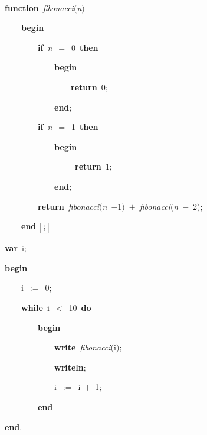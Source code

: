 
\fboxsep=0pt
\def\insert#1{$\fbox{#1}$}
\def\delete#1{$\fboxrule=.5mm\fbox{#1}$}
\rm
\ \par
{\bf function}\ {\it fibonacci}$(${\sl n}$)$\ \par
\ \ \ \ {\bf begin}\ \par
\ \ \ \ \ \ \ \ {\bf if}\ {\sl n}\ $=$\ 0\ {\bf then}\ \par
\ \ \ \ \ \ \ \ \ \ \ \ {\bf begin}\ \par
\ \ \ \ \ \ \ \ \ \ \ \ \ \ \ \ {\bf return}\ 0$;$\ \par
\ \ \ \ \ \ \ \ \ \ \ \ {\bf end}$;$\ \par
\ \ \ \ \ \ \ \ {\bf if}\ {\sl n}\ $=$\ 1\ {\bf then}\ \par
\ \ \ \ \ \ \ \ \ \ \ \ {\bf begin}\ \par
\ \ \ \ \ \ \ \ \ \ \ \ \ \ \ \ \ {\bf return}\ 1$;$\ \par
\ \ \ \ \ \ \ \ \ \ \ \ {\bf end}$;$\ \par
\ \ \ \ \ \ \ \ {\bf return}\ {\it fibonacci}$(${\sl n}\ $-$1$)$\ $+$\ {\it fibonacci}$(${\sl n}\ $-$\ 2$)$$;$\ \par
\ \ \ \ {\bf end}\ \insert{$;$}\ \par
{\bf var}\ i$;$\ \par
{\bf begin}\ \par
\ \ \ \ i\ $:=$\ 0$;$\ \par
\ \ \ \ {\bf while}\ i\ $<$\ 10\ {\bf do}\ \par
\ \ \ \ \ \ \ \ {\bf begin}\ \par
\ \ \ \ \ \ \ \ \ \ \ \ {\bf write}\ {\it fibonacci}$($i$)$$;$\ \par
\ \ \ \ \ \ \ \ \ \ \ \ {\bf writeln}$;$\ \par
\ \ \ \ \ \ \ \ \ \ \ \ i\ $:=$\ i\ $+$\ 1$;$\ \par
\ \ \ \ \ \ \ \ {\bf end}\ \par
{\bf end}$.$

